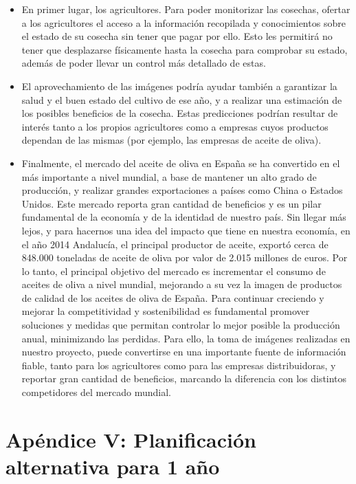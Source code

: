 \documentclass[12pt,oneside,a4paper]{article}
\numberwithin{figure}{section}
\begin{document}
\begin{itemize}
\item En primer lugar, los agricultores. Para poder monitorizar las cosechas, ofertar a los agricultores el acceso a la información recopilada y conocimientos sobre el estado de su cosecha sin tener que pagar por ello. Esto les permitirá no tener que desplazarse físicamente hasta la cosecha para comprobar su estado, además de poder llevar un control más detallado de estas.
\item El aprovechamiento de las imágenes podría ayudar también a garantizar la salud y el buen estado del cultivo de ese año, y a realizar una estimación de los posibles beneficios de la cosecha. Estas predicciones podrían resultar de interés tanto a los propios agricultores como a empresas cuyos productos dependan de las mismas (por ejemplo, las empresas de aceite de oliva).
\item Finalmente, el mercado del aceite de oliva en España se ha convertido en el más importante a nivel mundial, a base de mantener un alto grado de producción, y realizar grandes exportaciones a países como China o Estados Unidos. Este mercado reporta gran cantidad de beneficios y es un pilar fundamental de la economía y de la identidad de nuestro país. Sin llegar más lejos, y para hacernos una idea del impacto que tiene en nuestra economía, en el año 2014 Andalucía, el principal productor de aceite, exportó cerca de 848.000 toneladas de aceite de oliva por valor de 2.015 millones de euros. Por lo tanto, el principal objetivo del mercado es incrementar el consumo de aceites de oliva a nivel mundial, mejorando a su vez la imagen de productos de calidad de los aceites de oliva de España. Para continuar creciendo y mejorar la competitividad y sostenibilidad es fundamental promover soluciones y medidas que permitan controlar lo mejor posible la producción anual, minimizando las perdidas.  Para ello, la toma de imágenes realizadas en nuestro proyecto, puede convertirse en una importante fuente de información fiable, tanto para los agricultores como para las empresas distribuidoras, y reportar gran cantidad de beneficios, marcando la diferencia con los distintos competidores del mercado mundial.
\end{itemize}





\section{Apéndice V: Planificación alternativa para 1 año}
\end{document}

